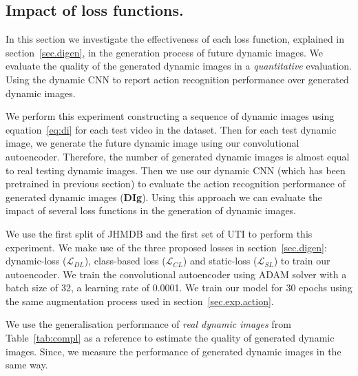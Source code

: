 \subsection{Impact of loss functions.}
\label{sec.exp.loss}
In this section we investigate the effectiveness of each loss function, explained in section~\ref{sec.digen}, in the generation process of future dynamic images. We evaluate the quality of the generated dynamic images in a {\em quantitative} evaluation. Using the dynamic CNN to report action recognition performance over generated dynamic images. %

We perform this experiment constructing a sequence of dynamic images using equation~\ref{eq:di} for each test video in the dataset. Then for each test dynamic image, we generate the future dynamic image using our convolutional autoencoder. Therefore, the number of generated dynamic images is almost equal to real testing dynamic images. Then we use our dynamic CNN (which has been pretrained in previous section) to evaluate the action recognition performance of generated dynamic images (\textbf{DIg}). Using this approach we can evaluate the impact of several loss functions in the generation of dynamic images. 

We use the first split of JHMDB and the first set of UTI to perform this experiment. We make use of the three proposed losses in section~\ref{sec.digen}: dynamic-loss ($\mathcal{L}_{DL}$), class-based loss ($\mathcal{L}_{CL}$) and static-loss ($\mathcal{L}_{SL}$) to train our autoencoder. We train the convolutional autoencoder using ADAM solver with a batch size of 32, a learning rate of 0.0001. We train our model for 30 epochs using the same augmentation process used in section~\ref{sec.exp.action}. 

We use the generalisation performance of {\em real dynamic images} from Table~\ref{tab:compl} as a reference to estimate the quality of generated dynamic images. Since, we measure the performance of generated dynamic images in the same way.


